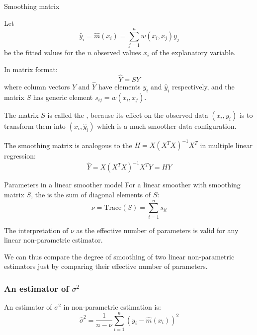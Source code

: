 \begin{definition}{Smoothing matrix}{}

	Let
	\begin{equation*}
		\hat y_i = \hat m (x_i) = \sum_{j=1}^n w(x_i, x_j) y_j
	\end{equation*}
	be the fitted values for the $n$ observed values  $x_i$ of the explanatory variable.

	In matrix format:
	\begin{equation*}
		\hat Y = S Y
	\end{equation*}
	where column vectors $Y$ and $\hat Y$ have elements $y_i$ and $\hat y_i$ respectively,
	and the matrix $S$ has generic element $s_{ij} = w(x_i, x_j)$.

	\begin{note}
		The matrix $S$ is called the , because its effect on the observed
		data $(x_i, y_i)$ is to transform them into $(x_i, \hat y_i)$ which is a much
		smoother data configuration.
	\end{note}

	\tcblower
	The smoothing matrix is analogous to the  $H = X(X^TX)^{-1}X^T$ in
	multiple linear regression:
	\begin{equation*}
		\hat Y = X(X^TX)^{-1}X^T Y = H Y
	\end{equation*}
\end{definition}

\begin{prop}{Parameters in a linear smoother model}{}
	For a linear smoother with smoothing matrix $S$, the  is the sum of diagonal elements of $S$:
	\begin{equation*}
		\nu = \text{Trace}(S) = \sum_{i=1}^n s_{ii}
	\end{equation*}
	\tcblower
	\begin{note}
		The interpretation of $\nu$ as the effective number of parameters is
		valid for any linear non-parametric estimator.
	\end{note}

	We can thus compare the degree of smoothing of two linear non-parametric
	estimators just by comparing their effective number of parameters.
\end{prop}

\subsubsection{An estimator of $\sigma^2$}
An estimator of $\sigma^2$ in non-parametric estimation is:
\begin{equation*}
	\hat\sigma^2 = \frac{1}{n-\nu} \sum_{i=1}^n (y_i - \hat m(x_i))^2
\end{equation*}

